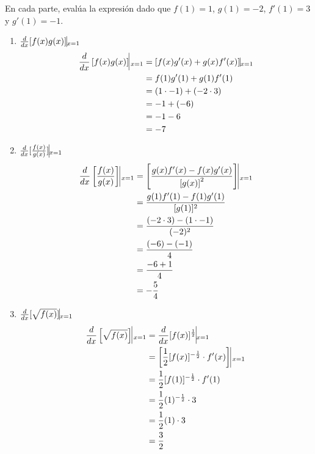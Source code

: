 \documentclass[12pt]{article}
\begin{document}
En cada parte, evalúa la expresión dado que $f(1)=1$, $g(1)=-2$, $f'(1)=3$ y $g'(1)=-1$.
\begin{enumerate}[label=(\alph*)]
\item $\frac{d}{dx} \lbrack f(x)g(x) \rbrack \vline _{x=1}$
  \begin{equation*}
    \begin{split}
      \frac{d}{dx} \left[ f(x)g(x) \right] \vline _{x=1}
      & = [f(x)g'(x)+g(x)f'(x)] \vline _{x=1} \\
      & = f(1)g'(1)+g(1)f'(1) \\
      & = (1 \cdot -1) + (-2 \cdot 3) \\
      & = -1 + (-6) \\
      & = -1-6 \\
      & =-7
    \end{split}
  \end{equation*}

\item $\frac{d}{dx} \lbrack \frac{f(x)}{g(x)} \rbrack \vline _{x=1}$
  \begin{equation*}
    \begin{split}
      \frac{d}{dx} \left [ \frac{f(x)}{g(x)} \right ] \vline _{x=1}
      & = \left[ \frac{g(x)f'(x)-f(x)g'(x)} {\left[ g(x) \right]^2} \right ] \vline _{x=1} \\
      & = \frac{g(1)f'(1)-f(1)g'(1)}{\lbrack g(1) \rbrack ^2}\\
      & = \frac{(-2 \cdot 3)-(1 \cdot -1)}{(-2) ^2}\\
      & = \frac{(-6)-(-1)}{4}\\
      & = \frac{-6+1}{4}\\
      & = - \frac{5}{4}\\
    \end{split}
  \end{equation*}

\item $\frac{d}{dx} \lbrack \sqrt{f(x)} \rbrack \vline _{x=1}$
  \begin{equation*}
    \begin{split}
      \frac{d}{dx} \left[ \sqrt{f(x)} \right] \vline _{x=1}
      & = \frac{d}{dx} { [f(x)]^{\frac{1}{2}} } \vline _{x=1} \\
      & = \left[ \frac{1}{2}[f(x)]^{-\frac{1}{2}} \cdot f'(x)\right] \vline _{x=1} \\
      & = \frac{1}{2}[f(1)]^{-\frac{1}{2}} \cdot f'(1)  \\
      & = \frac{1}{2}(1)^{-\frac{1}{2}} \cdot 3  \\
      & = \frac{1}{2}(1) \cdot 3  \\
      & = \frac{3}{2}
    \end{split}
  \end{equation*}


\end{enumerate}
\end{document}
